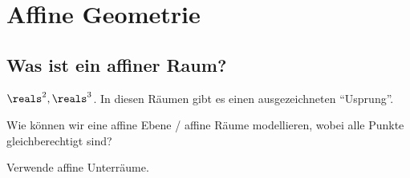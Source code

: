 \chapter{Affine Geometrie}
\section{Was ist ein affiner Raum?}

\begin{beispiel}
    \( \reals^2, \reals^3 \). 
    In diesen Räumen gibt es einen ausgezeichneten \enquote{Usprung}.
\end{beispiel}
\begin{frage*}
    Wie können wir eine affine Ebene / affine Räume modellieren, wobei alle Punkte gleichberechtigt sind?
\end{frage*}
\begin{idee*}
    Verwende affine Unterräume.
\end{idee*}
